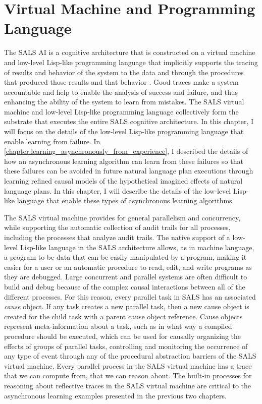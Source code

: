 \chapter{Virtual Machine and Programming Language}
\label{chapter:virtual_machine_and_programming_language}

The SALS AI is a cognitive architecture that is constructed on a
virtual machine and low-level Lisp-like programming language that
implicitly supports the tracing of results and behavior of the system
to the data and through the procedures that produced those results and
that behavior \cite[]{morgan:2009}.  Good traces make a system
accountable and help to enable the analysis of success and failure,
and thus enhancing the ability of the system to learn from mistakes.
The SALS virtual machine and low-level Lisp-like programming language
collectively form the substrate that executes the entire SALS
cognitive architecture.  In this chapter, I will focus on the details
of the low-level Lisp-like programming language that enable learning
from failure.  In
{\mbox{\autoref{chapter:learning_asynchronously_from_experience}}}, I
described the details of how an asynchronous learning algorithm can
learn from these failures so that these failures can be avoided in
future natural language plan executions through learning refined
causal models of the hypothetical imagined effects of natural language
plans.  In this chapter, I will describe the details of the low-level
Lisp-like language that enable these types of asynchronous learning
algorithms.

The SALS virtual machine provides for general parallelism and
concurrency, while supporting the automatic collection of audit trails
for all processes, including the processes that analyze audit trails.
The native support of a low-level Lisp-like language in the SALS
architecture allows, as in machine language, a program to be data that
can be easily manipulated by a program, making it easier for a user or
an automatic procedure to read, edit, and write programs as they are
debugged.  Large concurrent and parallel systems are often difficult
to build and debug because of the complex causal interactions between
all of the different processes.  For this reason, every parallel task
in SALS has an associated {\emph{cause}} object.  If any task creates
a new parallel task, then a new cause object is created for the child
task with a parent cause object reference.  Cause objects represent
meta-information about a task, such as in what way a compiled
procedure should be executed, which can be used for causally
organizing the effects of groups of parallel tasks, controlling and
monitoring the occurrence of any type of event through any of the
procedural abstraction barriers of the SALS virtual machine.  Every
parallel process in the SALS virtual machine has a trace that we can
compute from, that we can reason about.  The built-in processes for
reasoning about reflective traces in the SALS virtual machine are
critical to the asynchronous learning examples presented in the
previous two chapters.

